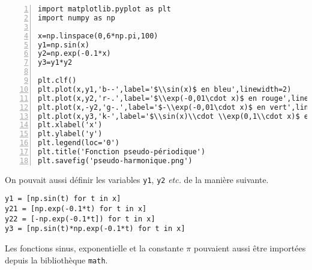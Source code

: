 \begin{Verbatim}[gobble=0,numbers=left]
import matplotlib.pyplot as plt
import numpy as np

x=np.linspace(0,6*np.pi,100)
y1=np.sin(x)
y2=np.exp(-0.1*x)
y3=y1*y2

plt.clf()
plt.plot(x,y1,'b--',label='$\\sin(x)$ en bleu',linewidth=2)
plt.plot(x,y2,'r-.',label='$\\exp(-0,01\cdot x)$ en rouge',linewidth=2)
plt.plot(x,-y2,'g-.',label='$-\\exp(-0,01\cdot x)$ en vert',linewidth=2)
plt.plot(x,y3,'k-',label='$\\sin(x)\\cdot \\exp(0,1\\cdot x)$ en noir',linewidth=2)
plt.xlabel('x')
plt.ylabel('y')
plt.legend(loc='0')
plt.title('Fonction pseudo-périodique')
plt.savefig('pseudo-harmonique.png')
\end{Verbatim}
On pouvait aussi définir les variables \texttt{y1}, \texttt{y2} \emph{etc.} de la manière suivante. 
\begin{verbatim}
y1 = [np.sin(t) for t in x]
y21 = [np.exp(-0.1*t) for t in x]
y22 = [-np.exp(-0.1*t]) for t in x]
y3 = [np.sin(t)*np.exp(-0.1*t) for t in x]
\end{verbatim}
Les fonctions sinus, exponentielle et la constante $\pi$ pouvaient aussi être importées depuis la bibliothèque \texttt{math}.
